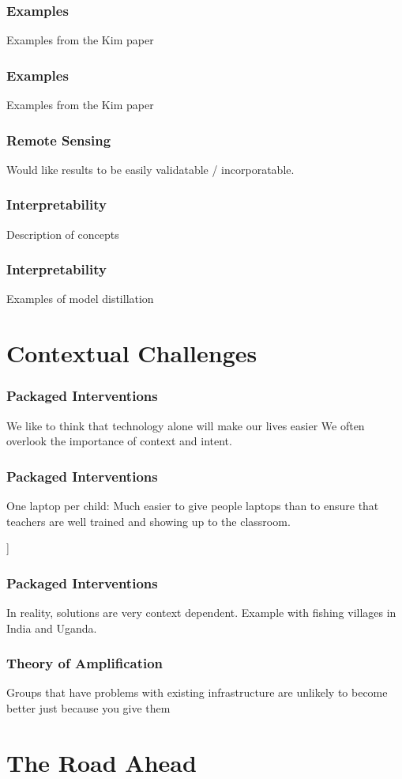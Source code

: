 \documentclass[10pt,mathserif]{beamer}
\begin{document}
\begin{frame}
  \frametitle{Examples}
  Examples from the Kim paper
\end{frame}

\begin{frame}
  \frametitle{Examples}
  Examples from the Kim paper
\end{frame}

\begin{frame}
  \frametitle{Remote Sensing}
  Would like results to be easily validatable / incorporatable.
\end{frame}

\begin{frame}
  \frametitle{Interpretability}
  Description of concepts
\end{frame}

\begin{frame}
  \frametitle{Interpretability}
  Examples of model distillation
\end{frame}

\section{Contextual Challenges}
\label{sec:label}

\begin{frame}
  \frametitle{Packaged Interventions}
  We like to think that technology alone will make our lives easier
  We often overlook the importance of context and intent.
\end{frame}

\begin{frame}
  \frametitle{Packaged Interventions}
  One laptop per child: Much easier to give people laptops than to ensure that
  teachers are well trained and showing up to the classroom.
\end{frame}

\begin{frame}]
  \frametitle{Packaged Interventions}
  In reality, solutions are very context dependent.
  Example with fishing villages in India and Uganda.
\end{frame}

\begin{frame}
  \frametitle{Theory of Amplification}
  Groups that have problems with existing infrastructure are unlikely to become
  better just because you give them
\end{frame}

\section{The Road Ahead}
\label{sec:label}
\end{document}
